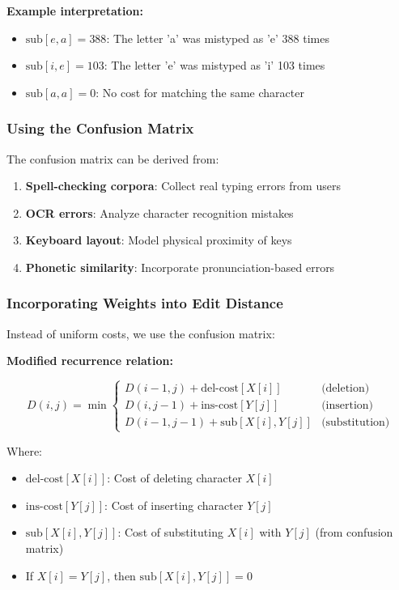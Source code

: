 \documentclass[11pt,a4paper]{article}
\theoremstyle{definition}
\theoremstyle{plain}
\theoremstyle{remark}
\begin{document}
\textbf{Example interpretation:}
\begin{itemize}
    \item $\text{sub}[e, a] = 388$: The letter 'a' was mistyped as 'e' 388 times
    \item $\text{sub}[i, e] = 103$: The letter 'e' was mistyped as 'i' 103 times
    \item $\text{sub}[a, a] = 0$: No cost for matching the same character
\end{itemize}

\subsubsection{Using the Confusion Matrix}

The confusion matrix can be derived from:
\begin{enumerate}
    \item \textbf{Spell-checking corpora}: Collect real typing errors from users
    \item \textbf{OCR errors}: Analyze character recognition mistakes
    \item \textbf{Keyboard layout}: Model physical proximity of keys
    \item \textbf{Phonetic similarity}: Incorporate pronunciation-based errors
\end{enumerate}

\subsubsection{Incorporating Weights into Edit Distance}

Instead of uniform costs, we use the confusion matrix:

\textbf{Modified recurrence relation:}

\[
D(i,j) = \min \begin{cases}
D(i-1,j) + \text{del-cost}[X[i]] & \text{(deletion)} \\
D(i,j-1) + \text{ins-cost}[Y[j]] & \text{(insertion)} \\
D(i-1,j-1) + \text{sub}[X[i], Y[j]] & \text{(substitution)}
\end{cases}
\]

Where:
\begin{itemize}
    \item $\text{del-cost}[X[i]]$: Cost of deleting character $X[i]$
    \item $\text{ins-cost}[Y[j]]$: Cost of inserting character $Y[j]$
    \item $\text{sub}[X[i], Y[j]]$: Cost of substituting $X[i]$ with $Y[j]$ (from confusion matrix)
    \item If $X[i] = Y[j]$, then $\text{sub}[X[i], Y[j]] = 0$
\end{itemize}
\end{document}
